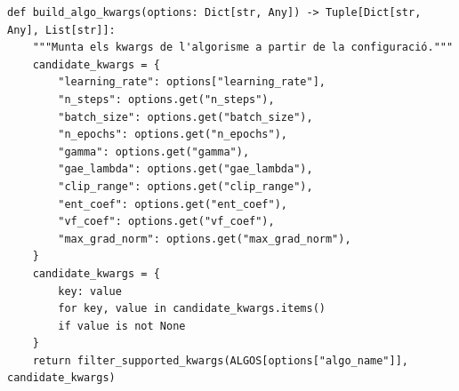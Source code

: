 \documentclass[10pt,a4paper]{article}
\begin{document}
\begin{lstlisting}[style=studioPython,caption={backend/entrenar\_agent\_rewards.py},label={lst:backend-entrenar-agent-rewards-py}]
def build_algo_kwargs(options: Dict[str, Any]) -> Tuple[Dict[str, Any], List[str]]:
    """Munta els kwargs de l'algorisme a partir de la configuració."""
    candidate_kwargs = {
        "learning_rate": options["learning_rate"],
        "n_steps": options.get("n_steps"),
        "batch_size": options.get("batch_size"),
        "n_epochs": options.get("n_epochs"),
        "gamma": options.get("gamma"),
        "gae_lambda": options.get("gae_lambda"),
        "clip_range": options.get("clip_range"),
        "ent_coef": options.get("ent_coef"),
        "vf_coef": options.get("vf_coef"),
        "max_grad_norm": options.get("max_grad_norm"),
    }
    candidate_kwargs = {
        key: value
        for key, value in candidate_kwargs.items()
        if value is not None
    }
    return filter_supported_kwargs(ALGOS[options["algo_name"]], candidate_kwargs)



\end{lstlisting}
\end{document}
